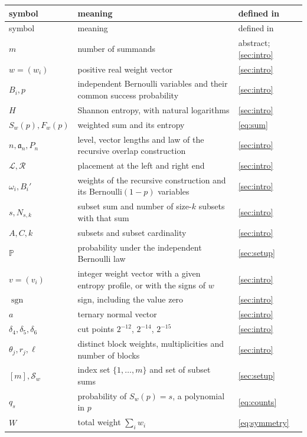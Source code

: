 \documentclass[11pt,a4paper]{article}
\numberwithin{equation}{section}
\theoremstyle{remark}
\newcommand{\Pp}{\mathbb P}
\newcommand{\sgn}{\operatorname{sgn}}
\begin{document}
\small
\begin{longtable}{p{}p{}p{}}
\toprule
symbol & meaning & defined in\\
\midrule
\endfirsthead
\toprule
symbol & meaning & defined in\\
\midrule
\endhead
\bottomrule
\endfoot
$m$ & number of summands & abstract; \cref{sec:intro}\\
$w=(w_i)$ & positive real weight vector & \cref{sec:intro}\\
$B_i,p$ & independent Bernoulli variables and their common success probability & \cref{sec:intro}\\
$H$ & Shannon entropy, with natural logarithms & \cref{sec:intro}\\
$S_w(p),F_w(p)$ & weighted sum and its entropy & \eqref{eq:sum}\\
$n,\mathfrak a_n,P_n$ & level, vector lengths and law of the recursive overlap construction & \cref{sec:intro}\\
$\mathcal L,\mathcal R$ & placement at the left and right end & \cref{sec:intro}\\
$\omega_i,B_i'$ & weights of the recursive construction and its Bernoulli$(1-p)$ variables & \cref{sec:intro}\\
$s,N_{s,k}$ & subset sum and number of size-$k$ subsets with that sum & \cref{sec:intro}\\
$A,C,k$ & subsets and subset cardinality & \cref{sec:intro}\\
$\Pp$ & probability under the independent Bernoulli law & \cref{sec:setup}\\
$v=(v_i)$ & integer weight vector with a given entropy profile, or with the signs of $w$ & \cref{sec:intro}\\
$\sgn$ & sign, including the value zero & \cref{sec:intro}\\
$a$ & ternary normal vector & \cref{sec:intro}\\
$\delta_4,\delta_5,\delta_6$ & cut points $2^{-12}$, $2^{-14}$, $2^{-15}$ & \cref{sec:intro}\\
$\theta_j,r_j,\ell$ & distinct block weights, multiplicities and number of blocks & \cref{sec:intro}\\
$[m],\mathcal S_w$ & index set $\{1,\ldots,m\}$ and set of subset sums & \cref{sec:setup}\\
$q_s$ & probability of $S_w(p)=s$, a polynomial in $p$ & \eqref{eq:counts}\\
$W$ & total weight $\sum_iw_i$ & \eqref{eq:symmetry}\\

\end{longtable}
\end{document}
